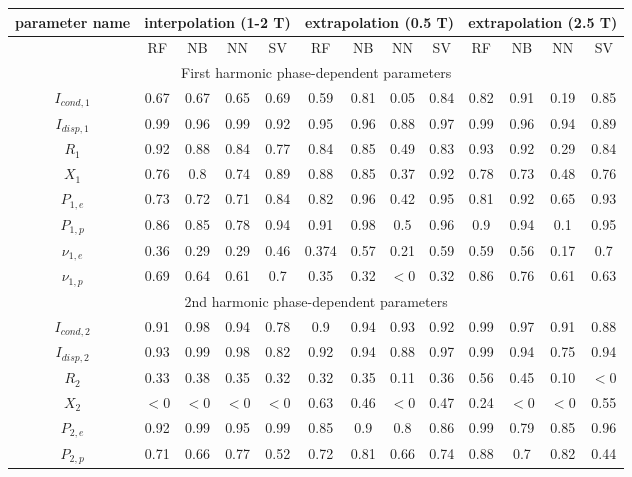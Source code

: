 \documentclass[12pt]{iopart}
\begin{document}
\begin{table}[]
    \centering
    
\begin{tabular}{|*{13}{c|}}  %
\hline
\multicolumn{1}{|c}{parameter name} & \multicolumn{4}{|c}{interpolation (1-2 T)} & \multicolumn{4}{|c|}{extrapolation (0.5 T)} & \multicolumn{4}{|c|}{extrapolation (2.5 T)} \\ \hline

 & RF & NB & NN & SV & RF & NB & NN & SV & RF & NB & NN & SV \\ \hline
\multicolumn{13}{c}{First harmonic phase-dependent parameters} \\
        \hline

$I_{cond,1}$ & 0.67&0.67 &0.65 &0.69 & 0.59&0.81 &0.05 &0.84 &0.82 &0.91 &0.19 &0.85\\ 
$I_{disp,1}$ &0.99 &0.96 &0.99 &0.92 &0.95 &0.96 &0.88 &0.97 &0.99 &0.96 &0.94 &0.89\\
$R_{1}$ &0.92 &0.88 &0.84 &0.77 &0.84 &0.85 &0.49 &0.83 &0.93 &0.92 &0.29 &0.84\\
$X_{1}$ &0.76 &0.8 &0.74 &0.89 &0.88 &0.85 &0.37 &0.92 &0.78 &0.73 &0.48 &0.76\\
$P_{1,e}$ &0.73 &0.72 &0.71 &0.84 & 0.82 &0.96 &0.42 &0.95&0.81 &0.92 &0.65 &0.93\\
$P_{1,p}$ &0.86 & 0.85&0.78 & 0.94& 0.91 &0.98 &0.5 &0.96 &0.9 &0.94 &0.1 &0.95\\
$\nu_{1,e}$ &0.36 &0.29 &0.29 &0.46 &0.374 &0.57 &0.21 &0.59 & 0.59&0.56 &0.17 &0.7\\
$\nu_{1,p}$ & 0.69&0.64 &0.61 &0.7 & 0.35&0.32 &$<0$ &0.32 &0.86 &0.76 &0.61 &0.63\\
 \hline
\multicolumn{13}{c}{2nd harmonic phase-dependent parameters} \\
        \hline
$I_{cond,2}$ &0.91 &0.98 &0.94 &0.78 &0.9 &0.94 &0.93 &0.92 &0.99 &0.97 &0.91 &0.88\\ 
$I_{disp,2}$ &0.93 &0.99 &0.98 & 0.82&0.92 &0.94 &0.88 &0.97 &0.99 &0.94 &0.75 &0.94\\
$R_{2}$ &0.33 &0.38 &0.35 &0.32 &0.32 &0.35 &0.11 &0.36 &0.56 &0.45 &0.10 &$<0$\\
$X_{2}$ &$<0$ &$<0$ &$<0$ & $<0$&0.63 &0.46 &$<0$ &0.47 &0.24 &$<0$ &$<0$ &0.55\\
$P_{2,e}$ &0.92 &0.99 &0.95 &0.99 & 0.85&0.9 &0.8 &0.86 & 0.99& 0.79 &0.85 &0.96\\
$P_{2,p}$ &0.71 &0.66 &0.77 &0.52 &0.72 &0.81 &0.66 &0.74 &0.88 &0.7 &0.82 &0.44\\

\end{tabular}
\end{table}
\end{document}
